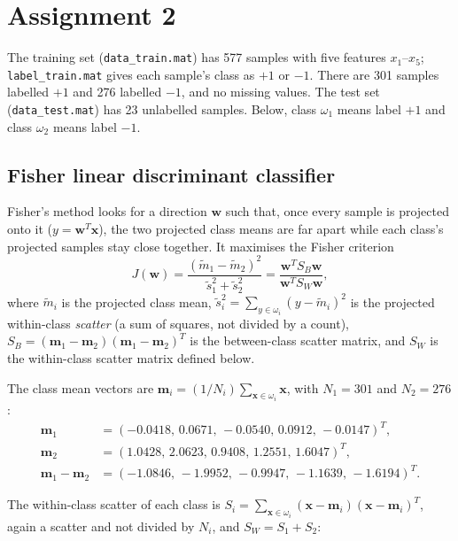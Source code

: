 \clearpage

\section{Assignment 2}

The training set (\texttt{data\_train.mat}) has 577 samples with five features $x_1$--$x_5$; \texttt{label\_train.mat} gives
each sample's class as $+1$ or $-1$. There are 301 samples labelled $+1$ and 276 labelled $-1$, and no missing values. The test
set (\texttt{data\_test.mat}) has 23 unlabelled samples. Below, class $\omega_1$ means label $+1$ and class $\omega_2$ means
label $-1$.

\subsection{Fisher linear discriminant classifier}

Fisher's method looks for a direction $\mathbf{w}$ such that, once every sample is projected onto it
($y = \mathbf{w}^T\mathbf{x}$), the two projected class means are far apart while each class's projected samples stay close
together. It maximises the Fisher criterion
\[
J(\mathbf{w}) = \frac{(\tilde{m}_1-\tilde{m}_2)^2}{\tilde{s}_1^2+\tilde{s}_2^2}
= \frac{\mathbf{w}^T S_B \mathbf{w}}{\mathbf{w}^T S_W \mathbf{w}},
\]
where $\tilde{m}_i$ is the projected class mean, $\tilde{s}_i^2 = \sum_{y\in\omega_i}(y-\tilde{m}_i)^2$ is the projected
within-class \emph{scatter} (a sum of squares, not divided by a count),
$S_B = (\mathbf{m}_1-\mathbf{m}_2)(\mathbf{m}_1-\mathbf{m}_2)^T$ is the between-class scatter matrix, and $S_W$ is the
within-class scatter matrix defined below.

The class mean vectors are $\mathbf{m}_i = (1/N_i)\sum_{\mathbf{x}\in\omega_i}\mathbf{x}$, with $N_1 = 301$ and $N_2 = 276$:
\begin{align*}
\mathbf{m}_1 &= (-0.0418,\, 0.0671,\, -0.0540,\, 0.0912,\, -0.0147)^T, \\
\mathbf{m}_2 &= (1.0428,\, 2.0623,\, 0.9408,\, 1.2551,\, 1.6047)^T, \\
\mathbf{m}_1-\mathbf{m}_2 &= (-1.0846,\, -1.9952,\, -0.9947,\, -1.1639,\, -1.6194)^T .
\end{align*}

The within-class scatter of each class is
$S_i = \sum_{\mathbf{x}\in\omega_i}(\mathbf{x}-\mathbf{m}_i)(\mathbf{x}-\mathbf{m}_i)^T$, again a scatter and not divided by
$N_i$, and $S_W = S_1 + S_2$:


